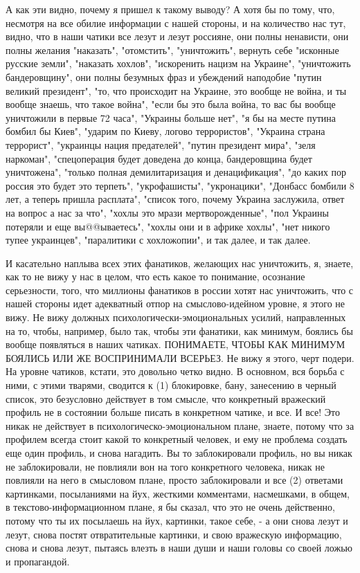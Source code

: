 А как эти видно, почему я пришел к такому выводу? А хотя бы по тому, что,
несмотря на все обилие информации с нашей стороны, и на количество нас тут,
видно, что в наши чатики все лезут и лезут россияне, они полны ненависти, они
полны желания "наказать", "отомстить", "уничтожить", вернуть себе "исконные
русские земли", "наказать хохлов", "искоренить нацизм на Украине", "уничтожить
бандеровщину", они полны безумных фраз и убеждений наподобие "путин великий
президент", "то, что происходит на Украине, это вообще не война, и ты вообще
знаешь, что такое война", "если бы это была война, то вас бы вообще уничтожили
в первые 72 часа", "Украины больше нет", "я бы на месте путина бомбил бы Киев",
"ударим по Киеву, логово террористов", "Украина страна террорист", "украинцы
нация предателей", "путин президент мира", "зеля наркоман", "спецоперация будет
доведена до конца, бандеровщина будет уничтожена", "только полная
демилитаризация и денацификация", "до каких пор россия это будет это терпеть",
"укрофашисты", "укронацики", "Донбасс бомбили 8 лет, а теперь пришла расплата",
"список того, почему Украина заслужила, ответ на вопрос а нас за что", "хохлы
это мрази мертворожденные", "пол Украины потеряли и еще вы@@ываетесь", "хохлы
они и в африке хохлы", "нет никого тупее украинцев", "паралитики с хохложопии",
и так далее, и так далее. 

И касательно наплыва всех этих фанатиков, желающих нас уничтожить, я, знаете,
как то не вижу у нас в целом, что есть какое то понимание, осознание
серьезности, того, что миллионы фанатиков в россии хотят нас уничтожить, что с
нашей стороны идет адекватный отпор на смыслово-идейном уровне, я этого не
вижу. Не вижу должных психологически-эмоциональных усилий, направленных на то,
чтобы, например, было так, чтобы эти фанатики, как минимум, боялись бы вообще
появляться в наших чатиках. ПОНИМАЕТЕ, ЧТОБЫ КАК МИНИМУМ БОЯЛИСЬ ИЛИ ЖЕ
ВОСПРИНИМАЛИ ВСЕРЬЕЗ. Не вижу я этого, черт подери.  На уровне чатиков, кстати,
это довольно четко видно. В основном, вся борьба с ними, с этими тварями,
сводится к (1) блокировке, бану, занесению в черный список, это безусловно
действует в том смысле, что конкретный вражеский профиль не в состоянии больше
писать в конкретном чатике, и все. И все!  Это никак не действует в
психологическо-эмоциональном плане, знаете, потому что за профилем всегда стоит
какой то конкретный человек, и ему не проблема создать еще один профиль, и
снова нагадить. Вы то заблокировали профиль, но вы никак не заблокировали, не
повлияли вон на того конкретного человека, никак не повлияли на него в
смысловом плане, просто заблокировали и все (2) ответами картинками,
посыланиями на йух, жесткими комментами, насмешками, в общем, в
текстово-информационном плане, я бы сказал, что это не очень действенно, потому
что ты их посылаешь на йух, картинки, такое себе, - а они снова лезут и лезут,
снова постят отвратительные картинки, и свою вражескую информацию, снова и
снова лезут, пытаясь влезть в наши души и наши головы со своей ложью и
пропагандой.

